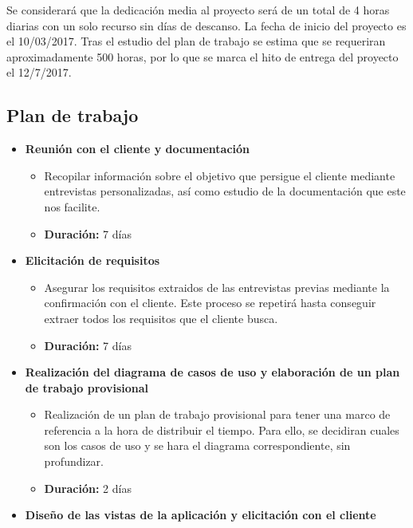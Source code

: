 \documentclass[openright,twoside,10pt]{book}
\providecommand{\tightlist}{%
  \setlength{\itemsep}{0pt}\setlength{\parskip}{0pt}}
\begin{document}
    Se considerará que la dedicación media al proyecto será de un total de 4
    horas diarias con un solo recurso sin días de descanso. La fecha de
    inicio del proyecto es el 10/03/2017. Tras el estudio del plan de
    trabajo se estima que se requeriran aproximadamente 500 horas, por lo
    que se marca el hito de entrega del proyecto el 12/7/2017.
    
    \subsection{Plan de trabajo}\label{plan-de-trabajo}
    
    \begin{itemize}
    \tightlist
    \item
      \textbf{Reunión con el cliente y documentación}
    
      \begin{itemize}
      \tightlist
      \item
        Recopilar información sobre el objetivo que persigue el cliente
        mediante entrevistas personalizadas, así como estudio de la
        documentación que este nos facilite.
      \item
        \textbf{Duración:} 7 días
      \end{itemize}
    \item
      \textbf{Elicitación de requisitos}
    
      \begin{itemize}
      \tightlist
      \item
        Asegurar los requisitos extraidos de las entrevistas previas
        mediante la confirmación con el cliente. Este proceso se repetirá
        hasta conseguir extraer todos los requisitos que el cliente busca.
      \item
        \textbf{Duración:} 7 días
      \end{itemize}
    \item
      \textbf{Realización del diagrama de casos de uso y elaboración de un
      plan de trabajo provisional}
    
      \begin{itemize}
      \tightlist
      \item
        Realización de un plan de trabajo provisional para tener una marco
        de referencia a la hora de distribuir el tiempo. Para ello, se
        decidiran cuales son los casos de uso y se hara el diagrama
        correspondiente, sin profundizar.
      \item
        \textbf{Duración:} 2 días
      \end{itemize}
    \item
      \textbf{Diseño de las vistas de la aplicación y elicitación con el
      cliente}
    

\end{itemize}
\end{document}
